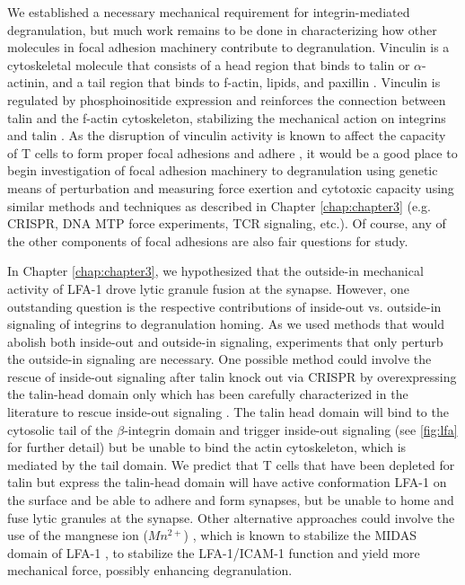 We established a necessary mechanical requirement for integrin-mediated degranulation, but much work remains to be done in characterizing how other molecules in focal adhesion machinery contribute to degranulation. Vinculin is a cytoskeletal molecule that consists of a head region that binds to talin or $\alpha$-actinin, and a tail region that binds to f-actin, lipids, and paxillin \cite{Goldmann2002}. Vinculin is regulated by phosphoinositide expression and reinforces the connection between talin and the f-actin cytoskeleton, stabilizing the mechanical action on integrins and talin \cite{Ezzell1997, Goldmann2002}. As the disruption of vinculin activity is known to affect the capacity of T cells to form proper focal adhesions and adhere \cite{Goldmann2002}, it would be a good place to begin investigation of focal adhesion machinery to degranulation using genetic means of perturbation and measuring force exertion and cytotoxic capacity using similar methods and techniques as described in Chapter \ref{chap:chapter3} (e.g. CRISPR, DNA MTP force experiments, TCR signaling, etc.). Of course, any of the other components of focal adhesions are also fair questions for study.

In Chapter \ref{chap:chapter3}, we hypothesized that the outside-in mechanical activity of LFA-1 drove lytic granule fusion at the synapse. However, one outstanding question is the respective contributions of inside-out vs. outside-in signaling of integrins to degranulation homing. As we used methods that would abolish both inside-out and outside-in signaling, experiments that only perturb the outside-in signaling are necessary. One possible method could involve the rescue of inside-out signaling after talin knock out via CRISPR by overexpressing the talin-head domain only which has been carefully characterized in the literature to rescue inside-out signaling \cite{Ciobanasu2018, Elliott2010, Ellis2014}. The talin head domain will bind to the cytosolic tail of the $\beta$-integrin domain and trigger inside-out signaling (see \ref{fig:lfa} for further detail) but be unable to bind the actin cytoskeleton, which is mediated by the tail domain. We predict that T cells that have been depleted for talin but express the talin-head domain will have active conformation LFA-1 on the surface and be able to adhere and form synapses, but be unable to home and fuse lytic granules at the synapse. Other alternative approaches could involve the use of the mangnese ion ($Mn^{2+}$) , which is known to stabilize the MIDAS domain of LFA-1 \cite{Meijne1994, Sen2018, Dixit2011}, to stabilize the LFA-1/ICAM-1 function and yield more mechanical force, possibly enhancing degranulation.

